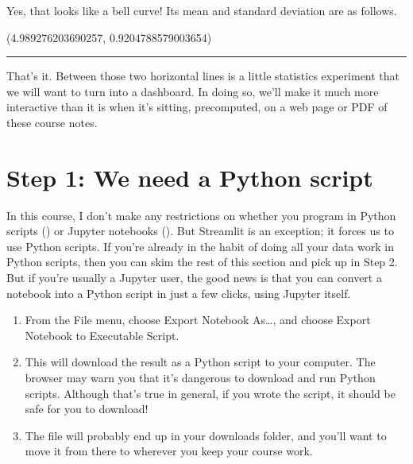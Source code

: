\documentclass[letterpaper,10pt,english]{sphinxmanual}
\begin{document}
\noindent{}

Yes, that looks like a bell curve!  Its mean and standard deviation are as follows.

\begin{sphinxVerbatim}[commandchars=\\\{\}]
     
\end{sphinxVerbatim}

\begin{sphinxVerbatim}[commandchars=\\\{\}]
(4.989276203690257, 0.9204788579003654)
\end{sphinxVerbatim}


\bigskip\hrule\bigskip


That’s it.  Between those two horizontal lines is a little statistics experiment that we will want to turn into a dashboard.  In doing so, we’ll make it much more interactive than it is when it’s sitting, pre\sphinxhyphen{}computed, on a web page or PDF of these course notes.


\section{Step 1: We need a Python script}
\label{\detokenize{chapter-14-dashboards:step-1-we-need-a-python-script}}
In this course, I don’t make any restrictions on whether you program in Python scripts () or Jupyter notebooks ().  But Streamlit is an exception; it forces us to use Python scripts.  If you’re already in the habit of doing all your data work in Python scripts, then you can skim the rest of this section and pick up in Step 2.  But if you’re usually a Jupyter user, the good news is that you can convert a notebook into a Python script in just a few clicks, using Jupyter itself.
\begin{enumerate}
%
\item {} 
From the File menu, choose Export Notebook As…, and choose Export Notebook to Executable Script.

\item {} 
This will download the result as a Python script to your computer.  The browser may warn you that it’s dangerous to download and run Python scripts.  Although that’s true in general, if you wrote the script, it should be safe for you to download!

\item {} 
The file will probably end up in your downloads folder, and you’ll want to move it from there to wherever you keep your course work.

\end{enumerate}
\end{document}
